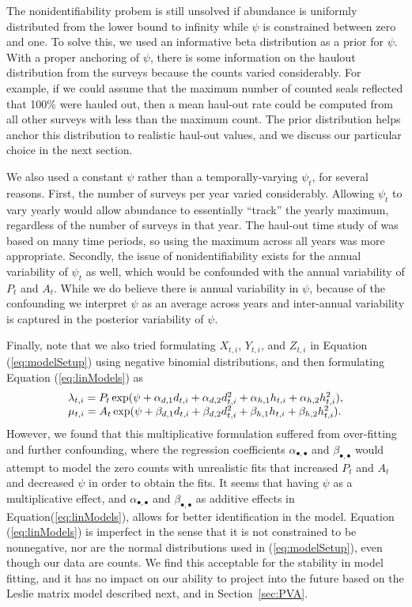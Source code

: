 \documentclass[12pt, titlepage]{article}\usepackage[]{graphicx}\usepackage[]{color}
\begin{document}
The nonidentifiability probem is still unsolved if abundance is uniformly distributed from the lower bound to infinity while $\psi$ is constrained between zero and one.  To solve this, we used an informative beta distribution as a prior for $\psi$. With a proper anchoring of $\psi$, there is some information on the haulout distribution from the surveys because the counts varied considerably. For example, if we could assume that the maximum number of counted seals reflected that 100\% were hauled out, then a mean haul-out rate could be computed from all other surveys with less than the maximum count. The prior distribution helps anchor this distribution to realistic haul-out values, and we discuss our particular choice in the next section.

We also used a constant $\psi$ rather than a temporally-varying $\psi_t$, for several reasons.  First, the number of surveys per year varied considerably.  Allowing $\psi_t$ to vary yearly would allow abundance to essentially ``track'' the yearly maximum, regardless of the number of surveys in that year.  The haul-out time study of \citet{Simp:With:Cesa:Bove:stab:2003} was based on many time periods, so using the maximum across all years was more appropriate.  Secondly, the issue of nonidentifiability exists for the annual variability of $\psi_t$ as well, which would be confounded with the annual variability of $P_t$ and $A_t$.  While we do believe there is annual variability in $\psi$, because of the confounding we interpret $\psi$ as an average across years and inter-annual variability is captured in the posterior variability of $\psi$.

Finally, note that we also tried formulating $X_{t,i}$, $Y_{t,i}$, and $Z_{t,i}$ in Equation (\ref{eq:modelSetup}) using negative binomial distributions, and then formulating Equation (\ref{eq:linModels}) as
\[
  \begin{tabular}{l}
    $\lambda_{t,i} = P_t \exp(\psi + \alpha_{d,1}d_{t,i} + \alpha_{d,2}d^2_{t,i} + \alpha_{h,1}h_{t,i} + \alpha_{h,2}h^2_{t,i})$, \\
    $\mu_{t,i} = A_t \exp(\psi + \beta_{d,1}d_{t,i} + \beta_{d,2}d^2_{t,i} + \beta_{h,1}h_{t,i} + \beta_{h,2}h^2_{t,i})$.
  \end{tabular}
\]
However, we found that this multiplicative formulation suffered from over-fitting and further confounding, where the regression coefficients $\alpha_{\bullet,\bullet}$ and $\beta_{\bullet,\bullet}$ would attempt to model the zero counts with unrealistic fits that increased $P_t$ and $A_t$ and decreased $\psi$ in order to obtain the fits.  It seems that having $\psi$ as a multiplicative effect, and $\alpha_{\bullet,\bullet}$ and $\beta_{\bullet,\bullet}$ as additive effects in Equation(\ref{eq:linModels}), allows for better identification in the model. Equation (\ref{eq:linModels}) is imperfect in the sense that it is not constrained to be nonnegative, nor are the normal distributions used in (\ref{eq:modelSetup}), even though our data are counts. We find this acceptable for the stability in model fitting, and it has no impact on our ability to project into the future based on the Leslie matrix model described next, and in Section~\ref{sec:PVA}.  
\end{document}
